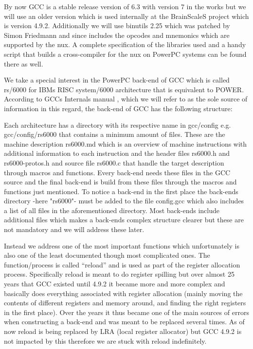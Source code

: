 By now GCC is a stable release version of 6.3 with version 7 in the works but we will use an older version which is used internally at the BrainScaleS project which is version 4.9.2.
Additionally we will use binutils 2.25 which was patched by Simon Friedmann and since includes the opcodes and mnemonics which are supported by the nux.
A complete specification of the libraries used and a handy script that builds a cross-compiler for the nux on PowerPC systems can be found there as well.

We take a special interest in the PowerPC back-end of GCC which is called rs/6000 for IBMs RISC system/6000 architecture that is equivalent to POWER.
According to GCCs Internals manual \cite{GCCint}, which we will refer to as the sole source of information in this regard, the back-end of GCC has the following structure:

Each architecture has a directory with its respective name in gcc/config e.g. gcc/config/rs6000 that contains a minimum amount of files.
These are the machine description rs6000.md which is an overview of machine instructions with additional information to each instruction and the header files rs6000.h and rs6000-protos.h and source file rs6000.c that handle the target description through macros and functions.
Every back-end needs these files in the GCC source and the final back-end is build from these files through the macros and functions just mentioned.
To notice a back-end in the first place the back-ends directory -here "rs6000"- must be added to the file config.gcc which also includes a list of all files in the aforementioned directory.
Most back-ends include additional files which makes a back-ends complex structure clearer but these are not mandatory and we will address these later.

Instead we address one of the most important functions which unfortunately is also one of the least documented though most complicated ones.
The function/process is called ``reload'' and is used as part of the register allocation process. 
Specifically reload is meant to do register spilling but over almost 25 years that GCC existed until 4.9.2 it became more and more complex and basically does everything associated with register allocation (mainly moving the contents of different registers and memory around, and finding the right registers in the first place).
Over the years it thus became one of the main sources of errors when constructing a back-end and was meant to be replaced several times.
As of now reload is being replaced by LRA (local register allocator) but GCC 4.9.2 is not impacted by this therefore we are stuck with reload indefinitely.

